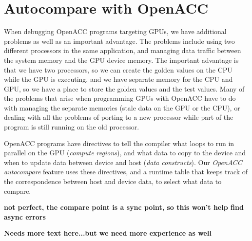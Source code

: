 \section{Autocompare with OpenACC}

When debugging OpenACC programs targeting GPUs, we have additional problems as well as an important advantage.
The problems include using two different processors in the same application, and managing data traffic between the system memory and the GPU device memory.
The important advantage is that we have two processors, so we can create the golden values on the CPU while the GPU is executing, and we have separate memory for the CPU and GPU, so we have a place to store the golden values and the test values.
Many of the problems that arise when programming GPUs with OpenACC have to do with managing the separate memories (stale data on the GPU or the CPU), or dealing with all the problems of porting to a new processor while part of the program is still running on the old processor.

OpenACC programs have directives to tell the compiler what loops to run in parallel on the GPU (\emph{compute regions}), and what data to copy to the device and when to update data between device and host (\emph{data constructs}).
Our \emph{OpenACC autocompare} feature uses these directives, and a runtime table that keeps track of the correspondence between host and device data, to select what data to compare.




\textbf{not perfect, the compare point is a sync point, so this won't help find async errors}

\textbf{Needs more text here...but we need more experience as well}
